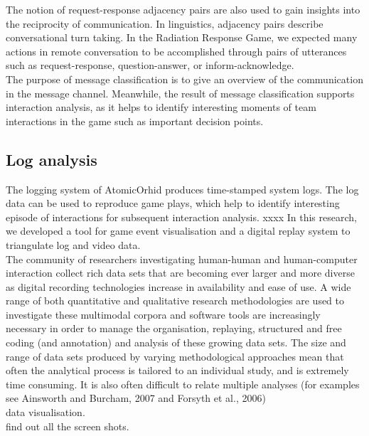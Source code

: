 The notion of request-response adjacency pairs are also used to gain insights into the reciprocity of communication. In linguistics, adjacency pairs describe conversational turn taking. In the Radiation Response Game, we expected many actions in remote conversation to be accomplished through pairs of utterances such as request-response, question-answer, or inform-acknowledge.\\

The purpose of message classification is to give an overview of the communication in the message channel. Meanwhile, the result of message classification supports interaction analysis, as it helps to identify interesting moments of team interactions in the game such as important decision points.\\

\subsection{Log analysis} 
The logging system of AtomicOrhid produces time-stamped system logs. The log data can be used to reproduce game plays, which help to identify interesting episode of interactions for subsequent interaction analysis. xxxx In this research, we developed a tool for game event visualisation and a digital replay system to triangulate log and video data. \\

The community of researchers investigating human-human and human-computer interaction collect rich data sets that are becoming ever larger and more diverse as digital recording technologies increase in availability and ease of use. A wide range of both quantitative and qualitative research methodologies are used to investigate these multimodal corpora and software tools are increasingly necessary in order to manage the organisation, replaying, structured and free coding (and annotation) and analysis of these growing data sets. The size and range of data sets produced by varying methodological approaches mean that often the analytical process is tailored to an individual study, and is extremely time consuming. It is also often difficult to relate multiple analyses (for examples see Ainsworth and Burcham, 2007 and Forsyth et al., 2006)\\

data visualisation. \\

find out all the screen shots.\\


